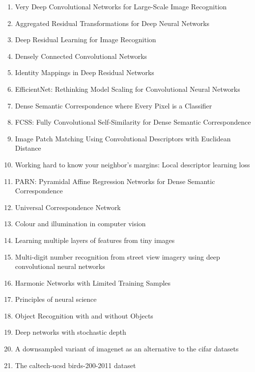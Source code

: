 \documentclass[acmlarge]{acmart}
\begin{document}
\begin{enumerate}
	\item Very Deep Convolutional Networks for Large-Scale Image Recognition \cite{simonyan2014deep}
	\item Aggregated Residual Transformations for Deep Neural Networks \cite{xie2016aggregated}
	\item Deep Residual Learning for Image Recognition \cite{he2015deep}
	\item Densely Connected Convolutional Networks \cite{huang2016densely}
	\item Identity Mappings in Deep Residual Networks \cite{he2016identity}
	\item EfficientNet: Rethinking Model Scaling for Convolutional Neural Networks \cite{tan2019efficientnet}
	\item Dense Semantic Correspondence where Every Pixel is a Classifier \cite{bristow2015dense}
	\item FCSS: Fully Convolutional Self-Similarity for Dense Semantic Correspondence \cite{kim2017fcss}
	\item Image Patch Matching Using Convolutional Descriptors with Euclidean Distance \cite{melekhov2017image}
	\item Working hard to know your neighbor's margins: Local descriptor learning loss \cite{mishchuk2017working}
	\item PARN: Pyramidal Affine Regression Networks for Dense Semantic Correspondence \cite{jeon2018parn}
	\item Universal Correspondence Network \cite{choy2016universal}
	\item Colour and illumination in computer vision \cite{Finlayson2018ColourAI}
	\item Learning multiple layers of features from tiny images \cite{krizhevsky2009learning}
	\item Multi-digit number recognition from street view imagery using deep convolutional neural networks \cite{goodfellow2013multi}
	\item Harmonic Networks with Limited Training Samples \cite{ulicny2019harmonic}
	\item Principles of neural science \cite{kandel2000principles}
	\item Object Recognition with and without Objects \cite{zhu2016object}
	\item Deep networks with stochastic depth \cite{huang2016deep}
	\item A downsampled variant of imagenet as an alternative to the cifar datasets \cite{chrabaszcz2017downsampled}
	\item The caltech-ucsd birds-200-2011 dataset \cite{wah2011caltech}

\end{enumerate}
\end{document}
